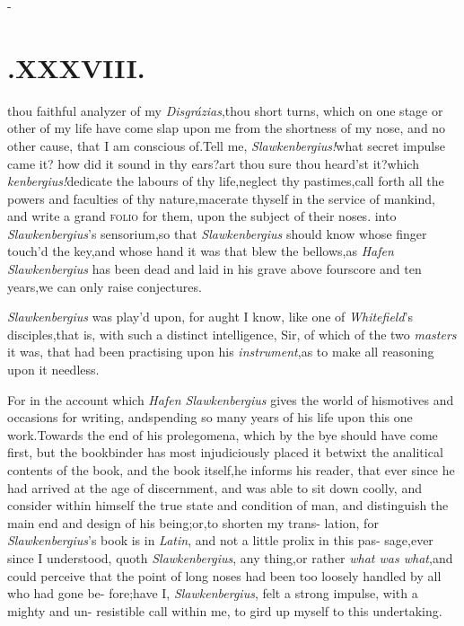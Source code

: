 \documentclass{article}
\begin{document}
\null\kern-\baselineskip
\section{.\quad  XXXVIII.}

\@ thou faithful
analyzer of my \textit{Disgrázias},\tsk thou 
short turns, which on one stage
or other of my life have come slap upon me from the
shortness of my nose, and no other cause, that I am
conscious of.\tsk Tell me, \textit{Slawkenbergius!}\@ what
secret impulse 
came it? how did it sound in thy ears?\tsk art thou sure thou
heard’st it?\tsk which 
\break\textit{kenbergius!}\@ dedicate the labours of thy
life,\tsk neglect thy pastimes,\tsk call forth all the
powers and faculties of thy nature,\break\tsh macerate thyself in
the service of mankind, and write a grand \textsc{folio} for
them, upon the subject of their noses.\hfill{}
into \textit{Slawkenbergius}’s sensorium,\tsk so that
\textit{Slawkenbergius} should know whose finger touch’d the
key,\tsh and whose hand it was that blew the bellows,\tsh as
\textit{Hafen Slawkenbergius} has been dead and laid in his
grave above fourscore and ten years,\tsh we can only raise
conjectures.

\textit{Slawkenbergius} was play’d upon, for aught I know,
like one of \textit{Whitefield}’s disciples,\tsk that
is, with such a distinct\break
intelligence, Sir, of which of the two
\textit{masters} it was, that had been practising upon his
\textit{instrument},\tsh as to make all reasoning upon it
needless.

\tsh For in the account which \textit{Hafen Slawkenbergius}
gives the world of his\break motives and occasions for
writing, and\break spending so many years of his life
upon this one work.\tsk Towards the end of his
prolegomena, which by the bye should have come first,\tsh
but the bookbinder has most injudiciously placed it betwixt
the analitical contents of the book, and the book
itself,\tsk he informs his reader, that ever since he had
arrived at the age of discernment, and was able to sit down
coolly, and consider within himself the true state and
condition of man, and distinguish the main end and design of
his being;\tsk or,\tsk to shorten my trans-\break
lation, for \textit{Slawkenbergius}’s book is in\break
\textit{Latin}, and not a little prolix in this pas-\break
sage,\tsk ever since I understood, quoth\break
\textit{Slawkenbergius}, any thing,\tsk or rather\break
\textit{what was what},\tsk and could perceive\break
that the point of long noses had been too\break
loosely handled by all who had gone be-\break 
fore;\tsh have I, \textit{Slawkenbergius}, felt a\break
strong impulse, with a mighty and un- resistible call
within me, to gird up myself to this undertaking.
\end{document}
